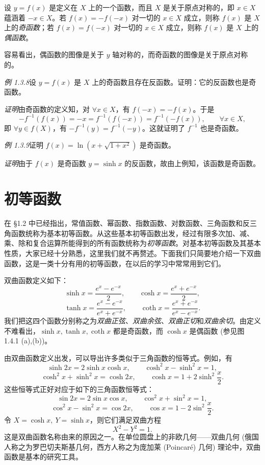\documentclass[UTF8,12pt,a4paper,fontset=fandol]{ctexbook}
\begin{document}
设 $y=f(x)$ 是定义在 $X$ 上的一个函数，而且 $X$ 是关于原点对称的，即 $x\in X$ 蕴涵着 $-x\in X$。若 $f(x)=-f(-x)$ 对一切的 $x\in X$ 成立，则称 $f(x)$ 是 $X$ 上的\emph{奇函数}；若 $f(x)=f(-x)$ 对一切的 $x\in X$ 成立，则称 $f(x)$ 是 $X$ 上的\emph{偶函数}。

容易看出，偶函数的图像是关于 $y$ 轴对称的，而奇函数的图像是关于原点对称的。

\noindent\emph{例 1.3.8}\quad 设 $y=f(x)$ 是 $X$ 上的奇函数且存在反函数。证明：它的反函数也是奇函数。

\noindent\emph{证明}\quad 由奇函数的定义知，对 $\forall x\in X$，有 $f(-x)=-f(x)$。于是
\[
  -f^{-1}(f(x))=-x=f^{-1}(f(-x))=f^{-1}(-f(x)),\qquad \forall x\in X,
\]
即 $\forall y\in f(X)$，有 $-f^{-1}(y)=f^{-1}(-y)$。这就证明了 $f^{-1}$ 也是奇函数。

\noindent\emph{例 1.3.9}\quad 证明 $f(x)=\ln(x+\sqrt{1+x^2})$ 是奇函数。

\noindent\emph{证明}\quad 由于 $f(x)$ 是奇函数 $y=\sinh x$ 的反函数，故由上例知，该函数是奇函数。

\section{初等函数}

在 §1.2 中已经指出，常值函数、幂函数、指数函数、对数函数、三角函数和反三角函数统称为基本初等函数。从这些基本初等函数出发，经过有限多次加、减、乘、除和复合运算所能得到的所有函数统称为\emph{初等函数}。对基本初等函数及其基本性质，大家已经十分熟悉，这里我们就不再赘述。下面我们只简要地介绍一下双曲函数，这是一类十分有用的初等函数，在以后的学习中常常用到它们。

双曲函数定义如下：
\[
  \sinh x=\frac{e^x-e^{-x}}{2},\qquad
  \cosh x=\frac{e^x+e^{-x}}{2},
\]
\[
  \tanh x=\frac{e^x-e^{-x}}{e^x+e^{-x}},\qquad
  \coth x=\frac{e^x+e^{-x}}{e^x-e^{-x}}.
\]
我们把这四个函数分别称之为\emph{双曲正弦}、\emph{双曲余弦}、\emph{双曲正切}和\emph{双曲余切}。由定义不难看出，$\sinh x,\tanh x,\coth x$ 都是奇函数，而 $\cosh x$ 是偶函数 (参见图 1.4.1 (a),(b))。

由双曲函数定义出发，可以导出许多类似于三角函数的恒等式。例如，有
\[
  \sinh 2x=2\sinh x\cosh x,\qquad
  \cosh^2x-\sinh^2x=1,
\]
\[
  \cosh^2x+\sinh^2x=\cosh 2x,\qquad
  \cosh x=1+2\sinh^2\frac x2.
\]
这些恒等式正好对应于如下的三角函数恒等式：
\[
  \sin 2x=2\sin x\cos x,\qquad
  \cos^2x+\sin^2x=1,
\]
\[
  \cos^2x-\sin^2x=\cos 2x,\qquad
  \cos x=1-2\sin^2\frac x2.
\]
令 $X=\cosh x,\ Y=\sinh x$，则它们满足双曲方程
\[
  X^2-Y^2=1.
\]
这是双曲函数名称由来的原因之一。在单位圆盘上的非欧几何——双曲几何 (俄国人称之为罗巴切夫斯基几何，西方人称之为庞加莱 (Poincaré) 几何) 理论中，双曲函数是基本的研究工具。
\end{document}
